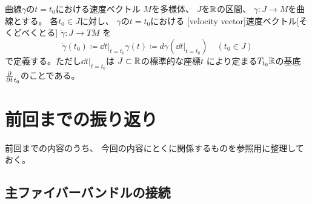 \documentclass[report]{jlreq}
\begin{document}
\begin{definition}[速度ベクトル]
        {曲線$\gamma$の$t = t_0$における速度ベクトル}
    $M$を多様体、
    $J$を$\mathbb{R}$の区間、
    $\gamma \colon J \to M$を{\smooth}曲線とする。
    各$t_0 \in J$に対し、
    $\gamma$の$t = t_0$における
    [velocity vector]{速度ベクトル}[そくどべくとる]
    $\dot{\gamma} \colon J \to TM$
    を
    \begin{equation}
        \dot{\gamma}(t_0)
            \coloneqq \dd{t}\bigg|_{t = t_0} \gamma(t)
            \coloneqq d\gamma\left(
                \dd{t}\bigg|_{t = t_0}
            \right)
            \quad
            (t_0 \in J)
    \end{equation}
    で定義する。ただし$\dd{t}\bigg|_{t = t_0}$は
    $J \subset \mathbb{R}$の標準的な座標$t$
    により定まる$T_{t_0}\mathbb{R}$の基底
    $\deldel{t}_{t_0}$のことである。
\end{definition}

\begin{definition}[測地線]
    \TODO{}
\end{definition}



%
\chapter{前回までの振り返り}

前回までの内容のうち、
今回の内容にとくに関係するものを参照用に整理しておく。

%
\section{主ファイバーバンドルの接続}
\end{document}

